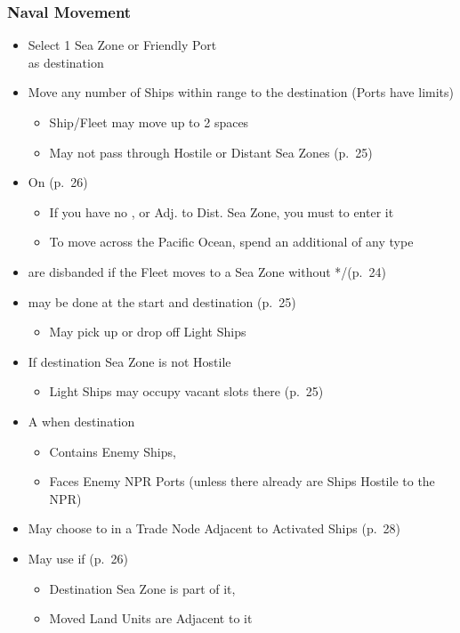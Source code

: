\documentclass[10pt]{article}
\begin{document}
\subsubsection*{Naval Movement}
\begin{itemize}
	\item Select 1 Sea Zone or Friendly Port\\
	as destination
	\item Move any number of Ships within range to the destination (Ports have limits)
	\begin{itemize}
		\item Ship/Fleet may move up to 2 spaces
		\item May not pass through Hostile or Distant Sea Zones (p.~25)
	\end{itemize}
	\item On  (p.~26)
	\begin{itemize}
		\item If you have no \claim, \town or \vassal Adj. to Dist. Sea Zone, you must  to enter it
		\item To move across the Pacific Ocean, spend an additional \monarchpower of any type
	\end{itemize}
	\item {} are disbanded if the Fleet moves to a Sea Zone without */\textdagger\xspace(p.~24)
	\item {} may be done at the start and destination (p.~25)
	\begin{itemize}
		\item May pick up or drop off Light Ships
	\end{itemize}
	\item If destination Sea Zone is not Hostile
	\begin{itemize}
		\item Light Ships may occupy vacant  slots there (p. 25)
	\end{itemize}
	\item {}A  when destination
	\begin{itemize}
		\item Contains Enemy Ships, 
		\item Faces Enemy NPR Ports (unless there already are Ships Hostile to the NPR)
	\end{itemize}
	\item {}May choose to  in a Trade Node Adjacent to Activated Ships (p.~28)
	\item May use  if (p.~26)
	\begin{itemize}
		\item Destination Sea Zone is part of it, 
		\item Moved Land Units are Adjacent to it
	\end{itemize}
\end{itemize}
\end{document}
